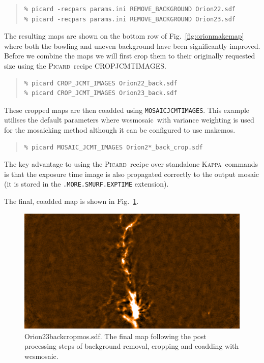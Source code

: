 \documentclass[twoside,11pt]{article}
\newcommand{\xref}[3]{#1}
\renewcommand{\_}{\texttt{\symbol{95}}}
\newenvironment{myquote}{\begin{quote}\begin{small}}{\end{small}\end{quote}}
\newcommand{\Kappa}{\xref{\textsc{Kappa}}{sun95}{}}
\newcommand{\picard}{\xref{\textsc{Picard}}{sun231}{}}
\newcommand{\drrecipe}[1]{\texttt{#1}}
\newcommand{\task}[1]{\textsf{#1}}
\newcommand{\wcsmosaic}{\xref{\task{wcsmosaic}}{sun95}{WCSMOSAIC}}
\newcommand{\makemos}{\xref{\task{makemos}}{sun139}{MAKEMOS}}
\begin{document}
\begin{myquote}
\begin{verbatim}
% picard -recpars params.ini REMOVE_BACKGROUND Orion22.sdf
% picard -recpars params.ini REMOVE_BACKGROUND Orion23.sdf
\end{verbatim}
\end{myquote}
The resulting maps are shown on the bottom row of
Fig.~\ref{fig:orionmakemap} where both the bowling and uneven
background have been significantly improved. Before we combine the
maps we will first crop them to their originally requested size using
the \picard\ recipe CROP\_JCMT\_IMAGES.
\begin{myquote}
\begin{verbatim}
% picard CROP_JCMT_IMAGES Orion22_back.sdf
% picard CROP_JCMT_IMAGES Orion23_back.sdf
\end{verbatim}
\end{myquote}

These cropped maps are then coadded using \drrecipe{MOSAIC\_JCMT\_IMAGES}. This
example utilises the default parameters where \wcsmosaic\ with variance
weighting is used for the mosaicking method although it can be
configured to use \makemos.
\begin{myquote}
\begin{verbatim}
% picard MOSAIC_JCMT_IMAGES Orion2*_back_crop.sdf
\end{verbatim}
\end{myquote}

The key advantage to using the \picard\ recipe over standalone \Kappa\
commands is that the exposure time image is also propagated correctly
to the output mosaic (it is stored in the \texttt{.MORE.SMURF.EXP\_TIME} extension).

The final, coadded map is shown in Fig.~\ref{fig:orionmosaic}.

\begin{figure}
\begin{center}
\includegraphics[width=\linewidth]{sc19_map22+23_back_crop_wcsmos.eps}
\caption{Orion23\_back\_crop\_mos.sdf. The final map following the
  post processing steps of background removal, cropping and coadding
  with wcsmosaic.}
\label{fig:orionmosaic}
\end{center}
\end{figure}
\end{document}
